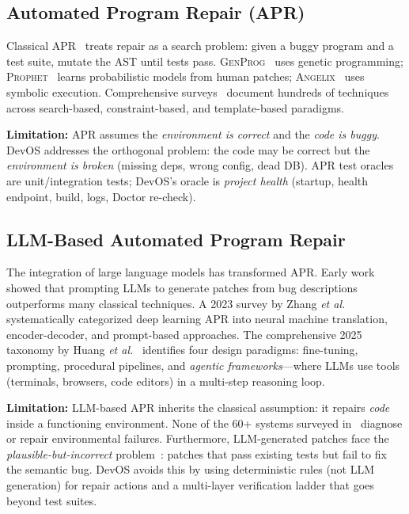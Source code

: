 \documentclass[conference,10pt,caption=false]{IEEEtran}
\newcommand{\etal}{\textit{et al.}\xspace}
\begin{document}
\subsection{Automated Program Repair (APR)}
\label{sec:apr}
Classical APR~\cite{genprog, prophet, angelix, repairnator} treats repair as a search problem: given a buggy program and a test suite, mutate the AST until tests pass. \textsc{GenProg}~\cite{genprog} uses genetic programming; \textsc{Prophet}~\cite{prophet} learns probabilistic models from human patches; \textsc{Angelix}~\cite{angelix} uses symbolic execution. Comprehensive surveys~\cite{apr-survey-2024} document hundreds of techniques across search-based, constraint-based, and template-based paradigms.

\textbf{Limitation:} APR assumes the \textit{environment is correct} and the \textit{code is buggy}. DevOS addresses the orthogonal problem: the code may be correct but the \textit{environment is broken} (missing deps, wrong config, dead DB). APR test oracles are unit/integration tests; DevOS's oracle is \textit{project health} (startup, health endpoint, build, logs, Doctor re-check).

\subsection{LLM-Based Automated Program Repair}
\label{sec:llm-apr}
The integration of large language models has transformed APR. Early work~\cite{copilot-repair, codex-repair} showed that prompting LLMs to generate patches from bug descriptions outperforms many classical techniques. A 2023 survey by Zhang \etal~\cite{llm-apr-survey-2023} systematically categorized deep learning APR into neural machine translation, encoder-decoder, and prompt-based approaches. The comprehensive 2025 taxonomy by Huang \etal~\cite{llm-apr-survey-2025} identifies four design paradigms: fine-tuning, prompting, procedural pipelines, and \textit{agentic frameworks}---where LLMs use tools (terminals, browsers, code editors) in a multi-step reasoning loop.

\textbf{Limitation:} LLM-based APR inherits the classical assumption: it repairs \textit{code} inside a functioning environment. None of the 60+ systems surveyed in~\cite{llm-apr-survey-2025} diagnose or repair environmental failures. Furthermore, LLM-generated patches face the \textit{plausible-but-incorrect} problem~\cite{llm-apr-survey-2023}: patches that pass existing tests but fail to fix the semantic bug. DevOS avoids this by using deterministic rules (not LLM generation) for repair actions and a multi-layer verification ladder that goes beyond test suites.
\end{document}
